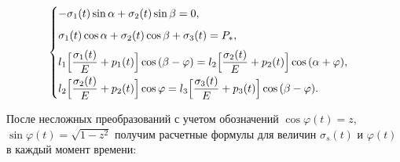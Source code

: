 \begin{equation}

\label{eq:12}

\begin{cases}

-\sigma_1 (t) \sin{\alpha} + \sigma_2 (t) \sin{\beta} = 0,\\[2mm]

\sigma_1 (t) \cos{\alpha} + \sigma_2 (t) \cos{\beta} + \sigma_3 (t) = P_\ast, \\[2mm]

l_1 \Bigl[ \dfrac{\sigma_1 (t)}{E} + p_1 (t) \Bigr] \cos{(\beta-\varphi)} = 

l_2 \Bigl[ \dfrac{\sigma_2 (t)}{E} + p_2 (t) \Bigr] \cos{(\alpha+\varphi)}, \\[2mm]

l_2 \Bigl[ \dfrac{\sigma_2 (t)}{E} + p_2 (t) \Bigr] \cos{\varphi} = 

l_3 \Bigl[ \dfrac{\sigma_3 (t)}{E} + p_3 (t) \Bigr] \cos{(\beta-\varphi)}.

\end{cases}

\end{equation}



После несложных преобразований с учетом обозначений $\cos{\varphi} (t) = z$, $\sin{\varphi} (t) = \sqrt{1-z^2}$ получим расчетные формулы для величин $\sigma_s (t)$ и $\varphi (t)$ в каждый момент времени:

